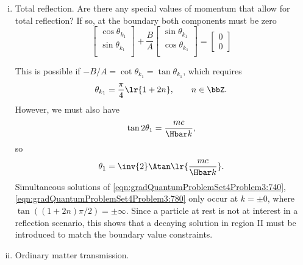 \begin{enumerate}[(i)]
\item Total reflection.  Are there any special values of momentum that allow for total reflection?  If so, at the boundary both components must be zero
%
\begin{equation}\label{eqn:gradQuantumProblemSet4Problem3:720}
\begin{bmatrix}
\cos\theta_{k_1} \\
\sin\theta_{k_1} \\
\end{bmatrix}
+
\frac{B}{A}
\begin{bmatrix}
\sin\theta_{k_1} \\
\cos\theta_{k_1} \\
\end{bmatrix}
=
\begin{bmatrix}
0 \\
0
\end{bmatrix}
\end{equation}

This is possible if \( -B/A = \cot\theta_{k_1} = \tan\theta_{k_1} \), which requires
%
\begin{equation}\label{eqn:gradQuantumProblemSet4Problem3:740}
\theta_{k_1} = \frac{\pi}{4} \lr{ 1 + 2 n }, \qquad n \in \bbZ.
\end{equation}
%
However, we must also have
%
\begin{equation}\label{eqn:gradQuantumProblemSet4Problem3:760}
\tan 2 \theta_1 = \frac{m c}{\Hbar k},
\end{equation}
%
so
%
\begin{equation}\label{eqn:gradQuantumProblemSet4Problem3:780}
\theta_1 = \inv{2} \Atan\lr{ \frac{m c}{\Hbar k} }.
\end{equation}
%
Simultaneous solutions of \cref{eqn:gradQuantumProblemSet4Problem3:740}, \cref{eqn:gradQuantumProblemSet4Problem3:780} only occur at \( k = \pm 0 \), where \( \tan( (1 + 2 n)\pi/2 ) = \pm \infty \).  Since a particle at rest is not at interest in a reflection scenario, this shows that a decaying solution in region II must be introduced to match the boundary value constraints.

\item Ordinary matter transmission.


\end{enumerate}
